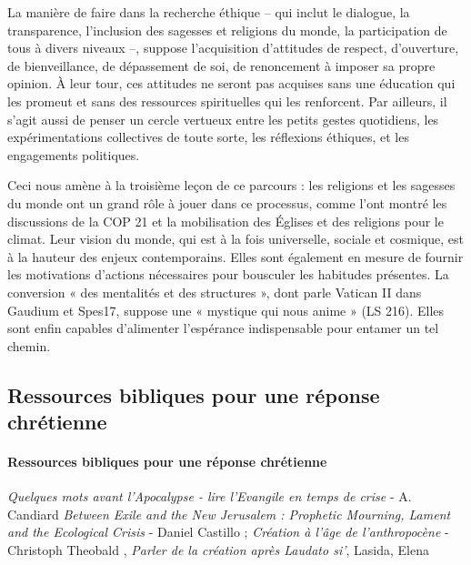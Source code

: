 \begin{singlequote}
    La manière de faire dans la recherche éthique – qui inclut le dialogue, la transparence, l’inclusion des sagesses et religions du monde, la participation de tous à divers niveaux –, suppose l’acquisition d’attitudes de respect, d’ouverture, de bienveillance, de dépassement de soi, de renoncement à imposer sa propre opinion. À leur tour, ces attitudes ne seront pas acquises sans une éducation qui les promeut et sans des ressources spirituelles qui les renforcent. Par ailleurs, il s’agit aussi de penser un cercle vertueux entre les petits gestes quotidiens, les expérimentations collectives de toute sorte, les réflexions éthiques, et les engagements politiques.\cite{thomasset_recherche_2019}
\end{singlequote}

  \begin{singlequote}
      Ceci nous amène à la troisième leçon de ce parcours : les religions et les sagesses du monde ont un grand rôle à jouer dans ce processus, comme l’ont montré les discussions de la COP 21 et la mobilisation des Églises et des religions pour le climat. Leur vision du monde, qui est à la fois universelle, sociale et cosmique, est à la hauteur des enjeux contemporains. Elles sont également en mesure de fournir les motivations d’actions nécessaires pour bousculer les habitudes présentes. La conversion « des mentalités et des structures », dont parle Vatican II dans Gaudium et Spes17, suppose une « mystique qui nous anime » (LS 216). Elles sont enfin capables d’alimenter l’espérance indispensable pour entamer un tel chemin.\cite{thomasset_recherche_2019}
  \end{singlequote}


\subsection{Ressources bibliques pour une réponse chrétienne}

\paragraph{Ressources bibliques pour une réponse chrétienne}
\textit{Quelques mots avant l’Apocalypse - lire l’Evangile en temps de crise} - A. Candiard \cite{candiard_quelques_2022}
\textit{Between Exile and the New Jerusalem : Prophetic Mourning, Lament and the Ecological Crisis} - Daniel Castillo \cite{cavanaugh_between_2018}; \textit{Création à l’âge de l’anthropocène} - Christoph Theobald \cite{theobald_repenser_2019},  \textit{Parler de la création après Laudato si’}, Lasida, Elena \cite{lasida_parler_2020}

